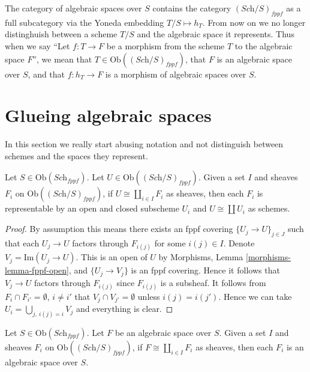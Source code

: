 \noindent
The category of algebraic spaces over $S$ contains the category
$(\textit{Sch}/S)_{fppf}$ as a full subcategory via the
Yoneda embedding $T/S \mapsto h_T$. From now on we no longer distinghuish
between a scheme $T/S$ and the algebraic space it represents.
Thus when we say ``Let $f : T \to F$ be a morphism from the scheme
$T$ to the algebraic space $F$'', we mean that
$T \in \text{Ob}((\textit{Sch}/S)_{fppf})$, that $F$ is an
algebraic space over $S$, and that $f : h_T \to F$ is a morphism
of algebraic spaces over $S$.








\section{Glueing algebraic spaces}
\label{section-glueing-algebraic-spaces}

\noindent
In this section we really start abusing notation and not
distinguish between schemes and the spaces they represent.

\begin{lemma}
\label{lemma-representable-sheaf-coproduct-sheaves}
Let $S \in \text{Ob}(\textit{Sch}_{fppf})$.
Let $U \in \text{Ob}((\textit{Sch}/S)_{fppf})$.
Given a set $I$ and sheaves $F_i$ on $\text{Ob}((\textit{Sch}/S)_{fppf})$,
if $U \cong \coprod_{i\in I} F_i$
as sheaves, then each $F_i$ is representable by an open and closed
subscheme $U_i$ and $U \cong \coprod U_i$ as schemes.
\end{lemma}

\begin{proof}
By assumption this means there exists an fppf covering
$\{U_j \to U\}_{j \in J}$ such that each $U_j \to U$
factors through $F_{i(j)}$ for some $i(j) \in I$.
Denote $V_j = \text{Im}(U_j \to U)$.
This is an open of $U$ by
Morphisms, Lemma \ref{morphisms-lemma-fppf-open}, and
$\{U_j \to V_j\}$ is an fppf covering. Hence it follows that
$V_j \to U$ factors through $F_{i(j)}$ since $F_{i(j)}$ is
a subsheaf. It follows from $F_i \cap F_{i'} = \emptyset$, $i \not = i'$
that $V_j \cap V_{j'} = \emptyset$
unless $i(j) = i(j')$. Hence we can take
$U_i = \bigcup_{j,\ i(j) = i} V_j$ and everything is clear.
\end{proof}

\begin{lemma}
\label{lemma-algebraic-space-coproduct-sheaves}
Let $S \in \text{Ob}(\textit{Sch}_{fppf})$.
Let $F$ be an algebraic space over $S$.
Given a set $I$ and sheaves $F_i$ on
$\text{Ob}((\textit{Sch}/S)_{fppf})$,
if $F \cong \coprod_{i\in I} F_i$ as sheaves,
then each $F_i$ is an algebraic space over $S$.
\end{lemma}

